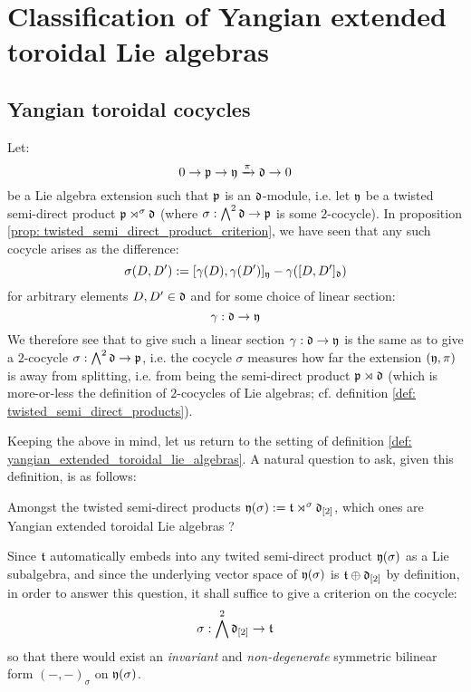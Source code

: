\section{Classification of Yangian extended toroidal Lie algebras}
    \subsection{Yangian toroidal cocycles}
        Let:
            $$0 \to \mathfrak{p} \to \mathfrak{y} \xrightarrow[]{\pi} \mathfrak{d} \to 0$$
        be a Lie algebra extension such that $\mathfrak{p}$ is an $\mathfrak{d}$-module, i.e. let $\mathfrak{y}$ be a twisted semi-direct product $\mathfrak{p} \rtimes^{\sigma} \mathfrak{d}$ (where $\sigma: \bigwedge^2 \mathfrak{d} \to \mathfrak{p}$ is some $2$-cocycle). In proposition \ref{prop: twisted_semi_direct_product_criterion}, we have seen that any such cocycle arises as the difference:
            $$\sigma(D, D') := [\gamma(D), \gamma(D')]_{\mathfrak{y}} - \gamma( [D, D']_{\mathfrak{d}} )$$
        for arbitrary elements $D, D' \in \mathfrak{d}$ and for some choice of linear section:
            $$\gamma: \mathfrak{d} \to \mathfrak{y}$$
        We therefore see that to give such a linear section $\gamma: \mathfrak{d} \to \mathfrak{y}$ is the same as to give a $2$-cocycle $\sigma: \bigwedge^2 \mathfrak{d} \to \mathfrak{p}$, i.e. the cocycle $\sigma$ measures how far the extension $(\mathfrak{y}, \pi)$ is away from splitting, i.e. from being the semi-direct product $\mathfrak{p} \rtimes \mathfrak{d}$ (which is more-or-less the definition of $2$-cocycles of Lie algebras; cf. definition \ref{def: twisted_semi_direct_products}).

        Keeping the above in mind, let us return to the setting of definition \ref{def: yangian_extended_toroidal_lie_algebras}. A natural question to ask, given this definition, is as follows:
        \begin{question}
            Amongst the twisted semi-direct products $\mathfrak{y}(\sigma) := \mathfrak{t} \rtimes^{\sigma} \mathfrak{d}_{[2]}$, which ones are Yangian extended toroidal Lie algebras ? 
        \end{question}
        Since $\mathfrak{t}$ automatically embeds into any twited semi-direct product $\mathfrak{y}(\sigma)$ as a Lie subalgebra, and since the underlying vector space of $\mathfrak{y}(\sigma)$ is $\mathfrak{t} \oplus \mathfrak{d}_{[2]}$ by definition, in order to answer this question, it shall suffice to give a criterion on the cocycle:
            $$\sigma: \bigwedge^2 \mathfrak{d}_{[2]} \to \mathfrak{t}$$
        so that there would exist an \textit{invariant} and \textit{non-degenerate} symmetric bilinear form $(-, -)_{\sigma}$ on $\mathfrak{y}(\sigma)$.

